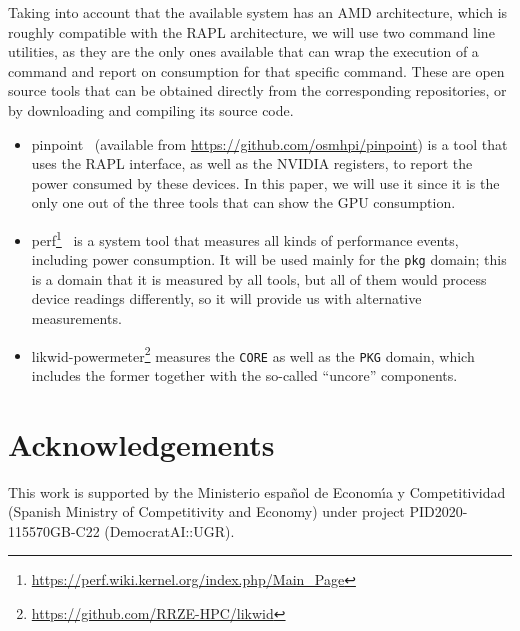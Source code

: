 \documentclass[a4paper,twoside]{article}
\begin{document}
Taking into account that the available system has an AMD architecture, which is
roughly compatible with the RAPL architecture, we will use two command line
utilities, as they are the only ones available that can wrap the execution of a command
and report on consumption for that specific command. These are open source tools
that can be obtained directly from the corresponding repositories, or by downloading and
compiling its source code. \begin{itemize}
\item {\sf pinpoint}~\cite{9307947} (available from
  \url{https://github.com/osmhpi/pinpoint}) is a tool that uses the RAPL
  interface, as well as the NVIDIA registers, to report the power consumed by
  these devices. In this paper, we will use it since it is the only one out of
  the three tools that can show the GPU consumption.
\item {\sf
    perf}\footnote{\url{https://perf.wiki.kernel.org/index.php/Main_Page}}~\cite{treibig2010likwid} is a
  system tool that measures all kinds of performance events, including power
  consumption. It will be used mainly for the  \texttt{pkg} domain; this is a
  domain that it is measured by all tools, but all of them would process device
    readings differently, so it will provide us with alternative measurements. %
\item {\sf likwid-powermeter}\footnote{\url{https://github.com/RRZE-HPC/likwid}}
  measures the \texttt{CORE} as well as the \texttt{PKG} domain, which includes
  the former together with the so-called ``uncore'' components.
  
  \end{itemize}

\section*{Acknowledgements}

This work is supported by the Ministerio espa\~{n}ol de Econom\'{\i}a y
Competitividad (Spanish Ministry of Competitivity and Economy) under project
PID2020-115570GB-C22 (DemocratAI::UGR).



{\small
}
\end{document}
